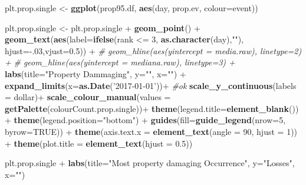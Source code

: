 \documentclass[]{article}
\newenvironment{Shaded}{\begin{snugshade}}{\end{snugshade}}
\newcommand{\KeywordTok}[1]{\textcolor[rgb]{0.13,0.29,0.53}{\textbf{{#1}}}}
\newcommand{\DataTypeTok}[1]{\textcolor[rgb]{0.13,0.29,0.53}{{#1}}}
\newcommand{\DecValTok}[1]{\textcolor[rgb]{0.00,0.00,0.81}{{#1}}}
\newcommand{\FloatTok}[1]{\textcolor[rgb]{0.00,0.00,0.81}{{#1}}}
\newcommand{\StringTok}[1]{\textcolor[rgb]{0.31,0.60,0.02}{{#1}}}
\newcommand{\CommentTok}[1]{\textcolor[rgb]{0.56,0.35,0.01}{\textit{{#1}}}}
\newcommand{\OtherTok}[1]{\textcolor[rgb]{0.56,0.35,0.01}{{#1}}}
\newcommand{\NormalTok}[1]{{#1}}
\begin{document}
\begin{Shaded}
\begin{Highlighting}[]
\NormalTok{plt.prop.single <-}\StringTok{ }\KeywordTok{ggplot}\NormalTok{(prop95.df, }\KeywordTok{aes}\NormalTok{(day, prop.ev, }\DataTypeTok{colour=}\NormalTok{event))}

\NormalTok{plt.prop.single <-}\StringTok{ }\NormalTok{plt.prop.single +}\StringTok{ }\KeywordTok{geom_point}\NormalTok{() +}
\StringTok{        }\KeywordTok{geom_text}\NormalTok{(}\KeywordTok{aes}\NormalTok{(}\DataTypeTok{label=}\KeywordTok{ifelse}\NormalTok{(rank <=}\StringTok{ }\DecValTok{3}\NormalTok{,}
                \KeywordTok{as.character}\NormalTok{(day),}\StringTok{""}\NormalTok{),}
                \DataTypeTok{hjust=}\NormalTok{-.}\DecValTok{03}\NormalTok{,}\DataTypeTok{vjust=}\FloatTok{0.5}\NormalTok{)) +}
\StringTok{        }\CommentTok{# geom_hline(aes(yintercept = media.raw), linetype=2) +}
\StringTok{         }\CommentTok{# geom_hline(aes(yintercept = mediana.raw), linetype=3) +}
\StringTok{        }\KeywordTok{labs}\NormalTok{(}\DataTypeTok{title=}\StringTok{"Property Dammaging"}\NormalTok{,}
                    \DataTypeTok{y=}\StringTok{""}\NormalTok{, }\DataTypeTok{x=}\StringTok{""}\NormalTok{) +}\StringTok{ }
\StringTok{                }
\StringTok{        }\KeywordTok{expand_limits}\NormalTok{(}\DataTypeTok{x=}\KeywordTok{as.Date}\NormalTok{(}\StringTok{'2017-01-01'}\NormalTok{))+}\StringTok{ }\CommentTok{#ok}
\StringTok{        }\KeywordTok{scale_y_continuous}\NormalTok{(}\DataTypeTok{labels =} \NormalTok{dollar)+}
\StringTok{        }
\StringTok{        }\KeywordTok{scale_colour_manual}\NormalTok{(}\DataTypeTok{values =} \KeywordTok{getPalette}\NormalTok{(colourCount.prop.single))+}\StringTok{                }
\StringTok{        }\KeywordTok{theme}\NormalTok{(}\DataTypeTok{legend.title=}\KeywordTok{element_blank}\NormalTok{()) +}
\StringTok{        }\KeywordTok{theme}\NormalTok{(}\DataTypeTok{legend.position=}\StringTok{"bottom"}\NormalTok{) +}
\StringTok{        }\KeywordTok{guides}\NormalTok{(}\DataTypeTok{fill=}\KeywordTok{guide_legend}\NormalTok{(}\DataTypeTok{nrow=}\DecValTok{5}\NormalTok{, }\DataTypeTok{byrow=}\OtherTok{TRUE}\NormalTok{)) +}
\StringTok{        }\KeywordTok{theme}\NormalTok{(}\DataTypeTok{axis.text.x =} \KeywordTok{element_text}\NormalTok{(}\DataTypeTok{angle =} \DecValTok{90}\NormalTok{, }\DataTypeTok{hjust =} \DecValTok{1}\NormalTok{)) +}\StringTok{ }
\StringTok{        }\KeywordTok{theme}\NormalTok{(}\DataTypeTok{plot.title =} \KeywordTok{element_text}\NormalTok{(}\DataTypeTok{hjust =} \FloatTok{0.5}\NormalTok{)) }

\NormalTok{plt.prop.single +}\StringTok{ }\KeywordTok{labs}\NormalTok{(}\DataTypeTok{title=}\StringTok{"Most property damaging Occurrence"}\NormalTok{,}
                    \DataTypeTok{y=}\StringTok{"Losses"}\NormalTok{, }\DataTypeTok{x=}\StringTok{""}\NormalTok{)}
\end{Highlighting}
\end{Shaded}
\end{document}
